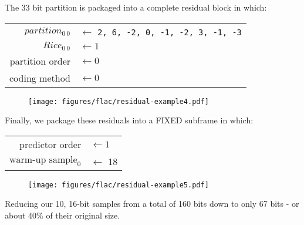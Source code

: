 The 33 bit partition is packaged into a complete residual block
in which:
\newline
\begin{tabular}{rl}
$partition_{0~0}$ & $\leftarrow$ \texttt{2, 6, -2, 0, -1, -2, 3, -1, -3} \\
$Rice_{0~0}$ & $\leftarrow 1$ \\
partition order & $\leftarrow 0$ \\
coding method & $\leftarrow 0$ \\
\end{tabular}
\begin{figure}[h]
\texttt{[image: figures/flac/residual-example4.pdf]}
\end{figure}
\par
Finally, we package these residuals into a FIXED subframe in which:
\newline
\begin{tabular}{rl}
predictor order & $\leftarrow 1$ \\
$\text{warm-up sample}_0$ & $\leftarrow $ 18 \\
\end{tabular}
\begin{figure}[h]
\texttt{[image: figures/flac/residual-example5.pdf]}
\end{figure}
\par
\noindent
Reducing our 10, 16-bit samples from a total of 160 bits
down to only 67 bits - or about 40\% of their original size.

\clearpage


